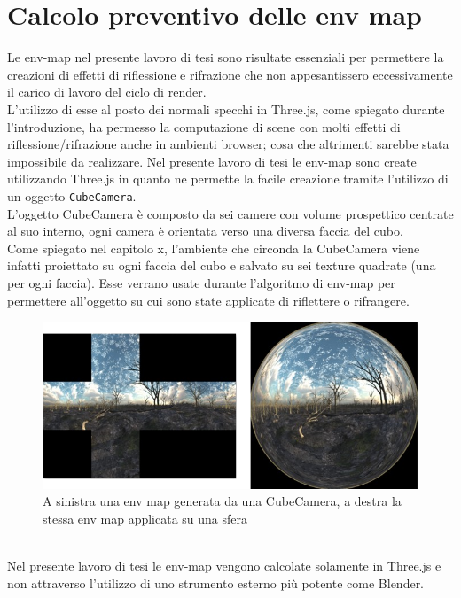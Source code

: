 \newpage
\section{Calcolo preventivo delle env map}
\label{sec:chapter_lrl_calcolo_preventivo_env}

Le env-map nel presente lavoro di tesi sono risultate essenziali per permettere la creazioni di effetti di riflessione e rifrazione che non appesantissero eccessivamente il carico di lavoro del ciclo di render.
\\
L’utilizzo di esse al posto dei normali specchi in Three.js, come spiegato durante l’introduzione, ha permesso la computazione di scene con molti effetti di riflessione/rifrazione anche in ambienti browser; cosa che altrimenti sarebbe stata impossibile da realizzare.
Nel presente lavoro di tesi le env-map sono create utilizzando Three.js in quanto ne permette la facile creazione tramite l’utilizzo di un oggetto \texttt{CubeCamera}.
\\
L’oggetto CubeCamera è composto da sei camere con volume prospettico centrate al suo interno, ogni camera è orientata verso una diversa faccia del cubo.
\\
Come spiegato nel capitolo x, l’ambiente che circonda la CubeCamera viene infatti proiettato su ogni faccia del cubo e salvato su sei texture quadrate (una per ogni faccia). Esse verrano usate durante l’algoritmo di env-map per permettere all’oggetto su cui sono state applicate di riflettere o rifrangere.
\\
\begin{figure}[htb]
 \centering
 \includegraphics[width=1\linewidth]{images/chapter_lrl/lrl_envmapcubica.png}\hfill
 \caption[Env map di riflessione]{A sinistra una env map generata da una CubeCamera, a destra la stessa env map applicata su una sfera}
 \label{fig:lrl_envmapcubica}
\end{figure}
\\
Nel presente lavoro di tesi le env-map vengono calcolate solamente in Three.js e non attraverso l’utilizzo di uno strumento esterno più potente come Blender.
